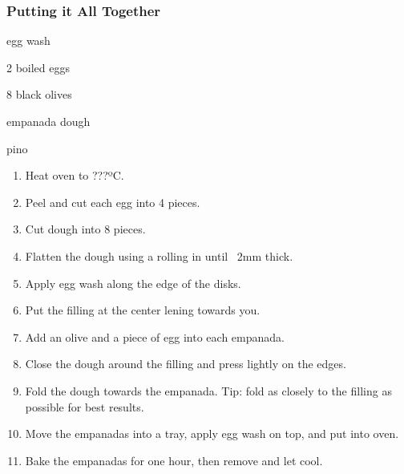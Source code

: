\subsubsection{Putting it All Together}
\begin{ingredients}
	\item egg wash
	\item 2 boiled eggs
	\item 8 black olives
	\item empanada dough
	\item pino
\end{ingredients}
\begin{enumerate}
	\item Heat oven to ???ºC.
	\item Peel and cut each egg into 4 pieces.
	\item Cut dough into 8 pieces.
	\item Flatten the dough using a rolling in until ~2mm thick.
	\item Apply egg wash along the edge of the disks.
	\item Put the filling at the center lening towards you.
	\item Add an olive and a piece of egg into each empanada.
	\item Close the dough around the filling and press lightly on the edges.
	\item Fold the dough towards the empanada. Tip: fold as closely to the filling as possible for best results.
	\item Move the empanadas into a tray, apply egg wash on top, and put into oven.
	\item Bake the empanadas for one hour, then remove and let cool.
\end{enumerate}

